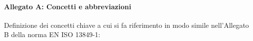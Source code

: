 \documentclass[a4paper,11pt]{article}
\begin{document}
    \paragraph{Allegato A: Concetti e abbreviazioni}
    Definizione dei concetti chiave a cui si fa riferimento in modo simile nell'Allegato B della norma EN ISO 13849-1:

\end{document}
